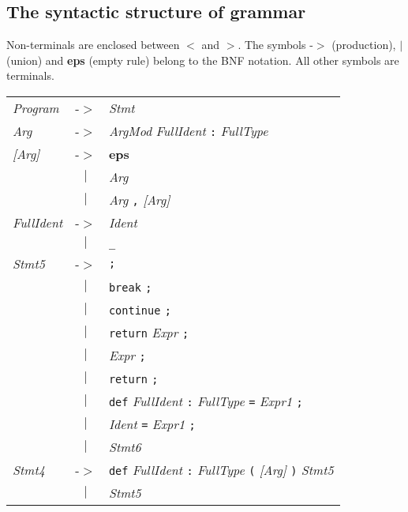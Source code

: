 \documentclass{article}
\begin{document}
\subsection*{The syntactic structure of grammar}

Non-terminals are enclosed between $<$ and $>$. 
The symbols -$>$ (production),  \textbf{$|$}  (union) 
and \textbf{eps} (empty rule) belong to the BNF notation. 
All other symbols are terminals.

\begin{center}\begin{tabular}{lll}
\textit{Program} & -$>$ & \textit{Stmt} \\
\textit{Arg} & -$>$ & \textit{ArgMod} \textit{FullIdent} \texttt{:} \textit{FullType} \\
\textit{[Arg]} & -$>$ & \textbf{eps} \\
 & \multicolumn{1}{c}{\textbf{$|$}} & \textit{Arg} \\
 & \multicolumn{1}{c}{\textbf{$|$}} & \textit{Arg} \texttt{,} \textit{[Arg]} \\
\textit{FullIdent} & -$>$ & \textit{Ident} \\
 & \multicolumn{1}{c}{\textbf{$|$}} & \texttt{\_} \\
\textit{Stmt5} & -$>$ & \texttt{;} \\
 & \multicolumn{1}{c}{\textbf{$|$}} & \texttt{break} \texttt{;} \\
 & \multicolumn{1}{c}{\textbf{$|$}} & \texttt{continue} \texttt{;} \\
 & \multicolumn{1}{c}{\textbf{$|$}} & \texttt{return} \textit{Expr} \texttt{;} \\
 & \multicolumn{1}{c}{\textbf{$|$}} & \textit{Expr} \texttt{;} \\
 & \multicolumn{1}{c}{\textbf{$|$}} & \texttt{return} \texttt{;} \\
 & \multicolumn{1}{c}{\textbf{$|$}} & \texttt{def} \textit{FullIdent} \texttt{:} \textit{FullType} \texttt{=} \textit{Expr1} \texttt{;} \\
 & \multicolumn{1}{c}{\textbf{$|$}} & \textit{Ident} \texttt{=} \textit{Expr1} \texttt{;} \\
 & \multicolumn{1}{c}{\textbf{$|$}} & \textit{Stmt6} \\
\textit{Stmt4} & -$>$ & \texttt{def} \textit{FullIdent} \texttt{:} \textit{FullType} \texttt{(} \textit{[Arg]} \texttt{)} \textit{Stmt5} \\
 & \multicolumn{1}{c}{\textbf{$|$}} & \textit{Stmt5} \\

\end{tabular}
\end{center}
\end{document}
